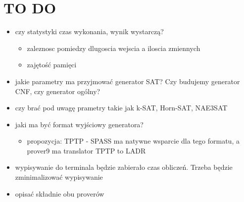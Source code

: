 \documentclass[a4paper,12pt]{article}
\begin{document}
\newpage
\section{TO DO}
\begin{itemize}
    \item czy statystyki czas wykonania, wynik wystarczą?
	\begin{itemize}
	    \item zaleznosc pomiedzy dlugoscia wejscia a iloscia zmiennych
	    \item zajętość pamięci
	\end{itemize}

    \item jakie parametry ma przyjmować generator SAT? Czy budujemy generator CNF, czy generator ogólny?
    \item  czy brać pod uwagę prametry takie jak
	k-SAT, Horn-SAT, NAE3SAT

    \item jaki ma być format wyjściowy generatora?
	\begin{itemize}
	    \item propozycja: TPTP - SPASS ma natywne wsparcie dla tego formatu, a prover9 ma translator TPTP to LADR
	\end{itemize}

    \item wypisywanie do terminala będzie zabierało czas obliczeń. Trzeba będzie zminimalizować wypisywanie
    \item opisać składnie obu proverów

\end{itemize}

\newpage
\end{document}
